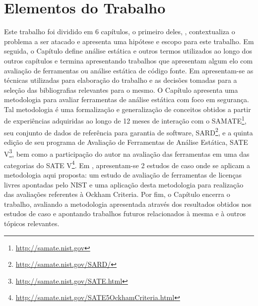 \section{Elementos do Trabalho}

Este trabalho foi dividido em 6 capítulos, o primeiro deles, , contextualiza o problema a ser atacado e apresenta uma hipótese e escopo para este trabalho. Em seguida, o Capítulo  define análise estática e outros termos utilizados ao longo dos outros capítulos e termina apresentando trabalhos que apresentam algum elo com avaliação de ferramentas ou análise estática de código fonte. Em  apresentam-se as técnicas utilizadas para elaboração do trabalho e as decisões tomadas para a seleção das bibliografias relevantes para o mesmo. O Capítulo  apresenta uma metodologia para avaliar ferramentas de análise estática com foco em segurança. Tal metodologia é uma formalização e generalização de conceitos obtidos  a partir de experiências adquiridas ao longo de 12 meses de interação com o SAMATE\footnote{\url{http://samate.nist.gov}}, seu conjunto de dados de referência para garantia de software, SARD\footnote{\url{http://samate.nist.gov/SARD/}}, e a quinta edição de seu programa de Avaliação de Ferramentas de Análise Estática, SATE V\footnote{\url{http://samate.nist.gov/SATE.html}}, bem como a participação do autor na avaliação das ferramentas em uma das categorias do SATE V\footnote{\url{http://samate.nist.gov/SATE5OckhamCriteria.html}}. Em , apresentam-se 2 estudos de caso onde se aplicam a metodologia aqui proposta: um estudo de avaliação de ferramentas de licenças livres apontadas pelo NIST e uma aplicação desta metodologia para realização das avaliações referentes à Ockham Criteria. Por fim, o Capítulo  encerra o trabalho, avaliando a metodologia apresentada através dos resultados obtidos nos estudos de caso e apontando trabalhos futuros relacionados à mesma e à outros tópicos relevantes.
